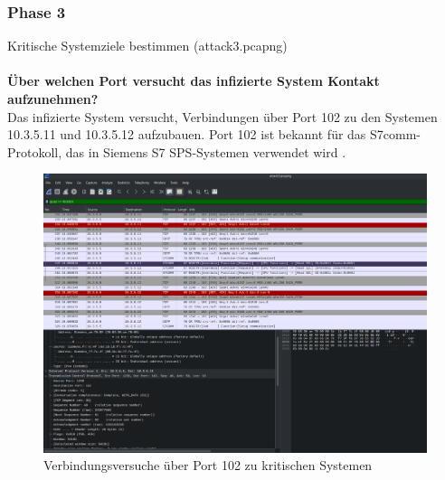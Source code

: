 \documentclass[
    a4paper,
    pagesize,
	pdftex,
    12pt,
]{scrartcl}
\begin{document}
\subsubsection{Phase 3}
Kritische Systemziele bestimmen (attack3.pcapng)
\\ \\
\textbf{Über welchen Port versucht das infizierte System Kontakt aufzunehmen?}
\\
Das infizierte System versucht, Verbindungen über Port 102 zu den Systemen 10.3.5.11 und 10.3.5.12 aufzubauen. Port 102 ist bekannt für das S7comm-Protokoll, das in Siemens S7 SPS-Systemen verwendet wird  \cite{port-sps}.

\begin{figure}[H]
    \centering
    \includegraphics[width=\textwidth]{ws-port-102-connections.png}
    \caption{Verbindungsversuche über Port 102 zu kritischen Systemen}
    \label{fig:ws-port-102-connections}
\end{figure}
\end{document}
